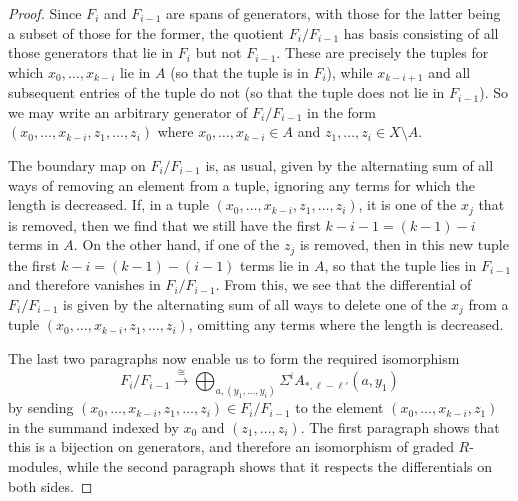 \documentclass[a4paper, 11 pt, oneside, reqno]{amsart}
\numberwithin{lemma}{section}
\theoremstyle{definition}
\begin{document}
\begin{proof}
    Since $F_i$ and $F_{i-1}$ are spans of generators,
    with those for the latter 
    being a subset of those for the former,
    the quotient $F_i/F_{i-1}$ has basis consisting of all those
    generators that lie in $F_i$ but not $F_{i-1}$.
    These are precisely the tuples for which
    $x_0,\ldots,x_{k-i}$ lie in $A$ (so that the tuple is in
    $F_i$), while $x_{k-i+1}$ and all subsequent entries of the
    tuple do not (so that the tuple does not lie in $F_{i-1}$).
    So we may write an arbitrary generator of $F_i/F_{i-1}$ in the
    form $(x_0,\ldots,x_{k-i},z_1,\ldots,z_i)$ 
    where $x_0,\ldots,x_{k-i}\in A$ 
    and $z_1,\ldots,z_i\in X\setminus A$.
    
    The boundary map on $F_i/F_{i-1}$ is, as usual, given by
    the alternating sum of all ways of removing an element from
    a tuple, ignoring any terms for which the length is decreased.
    If, in a tuple $(x_0,\ldots,x_{k-i},z_1,\ldots,z_i)$,
    it is one of the $x_j$ that is removed,
    then we find that we still have the first $k-i-1=(k-1)-i$
    terms in $A$. 
    On the other hand, if one of the $z_j$ is removed, then
    in this new tuple the first $k-i  = (k-1)-(i-1)$ 
    terms lie in $A$, so that the tuple lies in $F_{i-1}$ and 
    therefore vanishes in $F_i/F_{i-1}$.
    From this, we see that the differential of $F_i/F_{i-1}$ is
    given by the alternating sum of all ways to delete one
    of the $x_j$ from a tuple 
    $(x_0,\ldots,x_{k-i},z_1,\ldots, z_i)$, omitting any 
    terms where the length is decreased.
    
    The last two paragraphs now enable us to form the
    required isomorphism
    \[
        F_i/F_{i-1}
        \xrightarrow{\ \cong \ }
        \bigoplus_{a,(y_1,\ldots,y_i)}
        \Sigma^i A_{\ast,\ell-\ell'}(a,y_1)
    \]
    by sending 
    $(x_0,\ldots,x_{k-i},z_1,\ldots,z_i)\in F_i/F_{i-1}$
    to the element  $(x_0,\ldots,x_{k-i},z_1)$
    in the summand indexed by $x_0$ and $(z_1,\ldots,z_i)$.
    The first paragraph shows that this is a bijection on 
    generators, and therefore an isomorphism of 
    graded $R$-modules,
    while the second paragraph shows 
    that it respects the differentials on both sides.
\end{proof}
\end{document}
